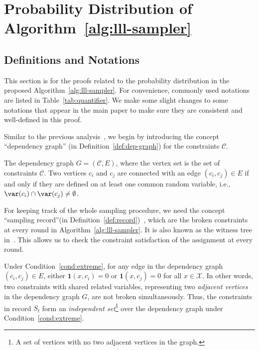 
\newpage
\onecolumn


\section{Probability Distribution  of Algorithm~\ref{alg:lll-sampler}}\label{appendix:prob-dist}
\subsection{Definitions and Notations}
This section is for the proofs related to the probability distribution in the proposed Algorithm~\ref{alg:lll-sampler}. For convenience, commonly used notations are listed in Table~\ref{tab:quantifier}. We make some slight changes to some notations that appear in the main paper to make sure they are consistent and well-defined in this proof.



Similar to the previous analysis~\cite{DBLP:journals/jacm/GuoJL19,DBLP:journals/arxiv/jerrum2021}, we begin by introducing the concept ``dependency graph'' (in Definition~\ref{def:dep-graph}) for the constraints $\mathcal{C}$. 


\begin{definition} \label{def:dep-graph}
The dependency graph $G=(\mathcal{C},E)$, where the vertex set is the set of constraints $\mathcal{C}$.  Two vertices $c_i$ and $c_j$ are connected with an edge $(c_i,c_j)\in E$ if and only if they are defined on at least one common random variable, i.e., $\var(c_i)\cap\var(c_j) \neq \emptyset$. 
\end{definition}



For keeping track of the whole sampling procedure, we need the concept ``sampling record''(in Definition~\ref{def:record})~\cite{DBLP:journals/jacm/GuoJL19}, which are the broken constraints at every round in Algorithm~\ref{alg:lll-sampler}. It is also known as the witness tree in~\citet{DBLP:journals/jacm/MoserT10}.  This allows us to check the constraint satisfaction of the assignment at every round.

Under Condition~\ref{cond:extreme}, for any edge in the dependency graph $(c_i,c_j) \in E$,   either $\mathbf{1}(x,c_i)=0$ or $\mathbf{1}(x,c_j)=0$ for all $x\in \mathcal{X}$.
In other words, two constraints with shared related variables, representing two \textit{adjacent vertices} in the dependency graph $G$, are not broken simultaneously. Thus, the constraints in record $S_t$ form an \textit{independent set}\footnote{A set of vertices with no two adjacent vertices in the graph.} over the dependency graph under Condition~\ref{cond:extreme}.

